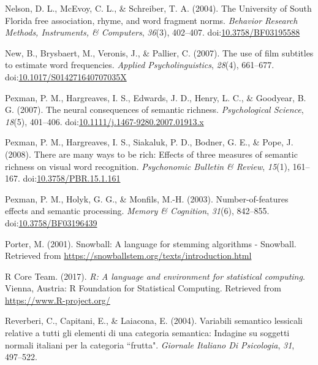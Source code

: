 \documentclass[english,,man]{apa6}
\begin{document}
\leavevmode\hypertarget{ref-Nelson2004}{}%
Nelson, D. L., McEvoy, C. L., \& Schreiber, T. A. (2004). The University of South Florida free association, rhyme, and word fragment norms. \emph{Behavior Research Methods, Instruments, \& Computers}, \emph{36}(3), 402--407. doi:\href{https://doi.org/10.3758/BF03195588}{10.3758/BF03195588}

\leavevmode\hypertarget{ref-New2007}{}%
New, B., Brysbaert, M., Veronis, J., \& Pallier, C. (2007). The use of film subtitles to estimate word frequencies. \emph{Applied Psycholinguistics}, \emph{28}(4), 661--677. doi:\href{https://doi.org/10.1017/S014271640707035X}{10.1017/S014271640707035X}

\leavevmode\hypertarget{ref-Pexman2007}{}%
Pexman, P. M., Hargreaves, I. S., Edwards, J. D., Henry, L. C., \& Goodyear, B. G. (2007). The neural consequences of semantic richness. \emph{Psychological Science}, \emph{18}(5), 401--406. doi:\href{https://doi.org/10.1111/j.1467-9280.2007.01913.x}{10.1111/j.1467-9280.2007.01913.x}

\leavevmode\hypertarget{ref-Pexman2008}{}%
Pexman, P. M., Hargreaves, I. S., Siakaluk, P. D., Bodner, G. E., \& Pope, J. (2008). There are many ways to be rich: Effects of three measures of semantic richness on visual word recognition. \emph{Psychonomic Bulletin \& Review}, \emph{15}(1), 161--167. doi:\href{https://doi.org/10.3758/PBR.15.1.161}{10.3758/PBR.15.1.161}

\leavevmode\hypertarget{ref-Pexman2003}{}%
Pexman, P. M., Holyk, G. G., \& Monfils, M.-H. (2003). Number-of-features effects and semantic processing. \emph{Memory \& Cognition}, \emph{31}(6), 842--855. doi:\href{https://doi.org/10.3758/BF03196439}{10.3758/BF03196439}

\leavevmode\hypertarget{ref-Porter2001}{}%
Porter, M. (2001). Snowball: A language for stemming algorithms - Snowball. Retrieved from \url{https://snowballstem.org/texts/introduction.html}

\leavevmode\hypertarget{ref-R-base}{}%
R Core Team. (2017). \emph{R: A language and environment for statistical computing}. Vienna, Austria: R Foundation for Statistical Computing. Retrieved from \url{https://www.R-project.org/}

\leavevmode\hypertarget{ref-Reverberi2004}{}%
Reverberi, C., Capitani, E., \& Laiacona, E. (2004). Variabili semantico lessicali relative a tutti gli elementi di una categoria semantica: Indagine su soggetti normali italiani per la categoria ``frutta". \emph{Giornale Italiano Di Psicologia}, \emph{31}, 497--522.
\end{document}
